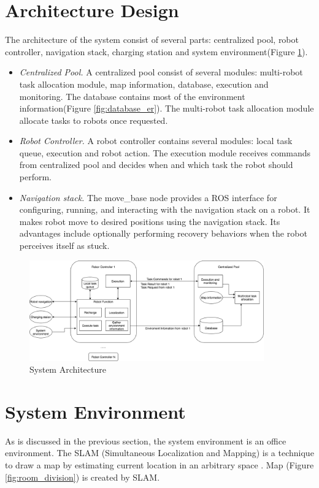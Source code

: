 \section{Architecture Design}

The architecture of the system consist of several parts: centralized pool, robot controller, navigation stack, charging station and system environment(Figure \ref{fig:system_architecture}). 
\begin{itemize}
	\item \textsl{Centralized Pool.} A centralized pool consist of several modules: multi-robot task allocation module, map information, database, execution and monitoring. The database contains most of the environment information(Figure \ref{fig:database_er}). The multi-robot task allocation module allocate tasks to robots once requested.
	\item \textsl{Robot Controller.} A robot controller contains several modules: local task queue, execution and robot action. The execution module receives commands from centralized pool and decides when and which task the robot should perform.
	\item \textsl{Navigation stack.} The move\_base node provides a ROS interface for configuring, running, and interacting with the navigation stack on a robot. It makes robot move to desired positions using the navigation stack. Its advantages include optionally performing recovery behaviors when the robot perceives itself as stuck\cite{move_base_node}. 
\end{itemize} 

\begin{figure}[htbp]
	\centering
	\includegraphics[width = 0.9\textwidth]{content/images/ch3/architecture.drawio.png}
	\caption{System Architecture}
	\label{fig:system_architecture}
\end{figure}

\section{System Environment}
\label{sec:system_enviroment}
As is discussed in the previous section, the system environment is an office environment. The SLAM (Simultaneous Localization and Mapping) is a technique to draw a map by estimating current location in an arbitrary space \cite{slam}. Map (Figure \ref{fig:room_division}) is created by SLAM.


